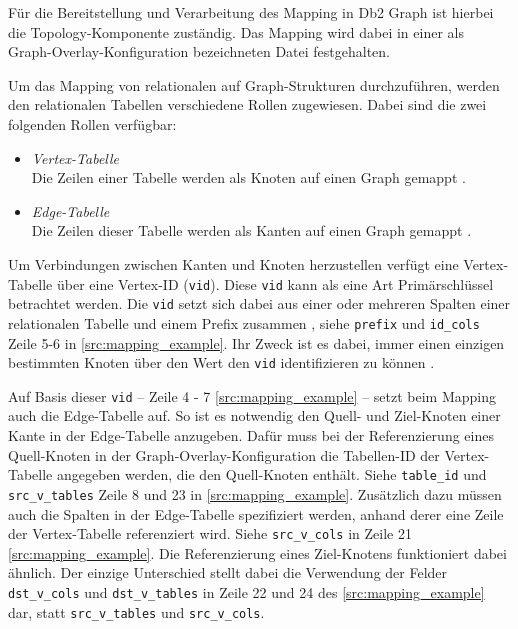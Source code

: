 Für die Bereitstellung und Verarbeitung des Mapping in Db2 Graph ist hierbei die Topology-Komponente zuständig. Das Mapping wird dabei in einer als Graph-Overlay-Konfiguration bezeichneten Datei festgehalten.  

Um das Mapping von relationalen auf Graph-Strukturen durchzuführen, werden den relationalen Tabellen verschiedene Rollen zugewiesen. Dabei sind die zwei folgenden Rollen verfügbar:
\begin{itemize}
    \item \textit{Vertex-Tabelle}\\Die Zeilen einer Tabelle werden als Knoten auf einen Graph gemappt \cite{sigmod_tian, yt_tian}.
    \item \textit{Edge-Tabelle}\\Die Zeilen dieser Tabelle werden als Kanten auf einen Graph gemappt \cite{sigmod_tian, yt_tian}.
\end{itemize}


Um Verbindungen zwischen Kanten und Knoten herzustellen verfügt eine Vertex-Tabelle über eine Vertex-ID (\texttt{vid}). Diese \texttt{vid} kann als eine Art Primärschlüssel betrachtet werden. Die \texttt{vid} setzt sich dabei aus einer oder mehreren Spalten einer relationalen Tabelle und einem Prefix zusammen \cite{sigmod_tian, yt_tian}, siehe \texttt{prefix} und \texttt{id\_cols} Zeile 5-6 in \autoref{src:mapping_example}. Ihr Zweck ist es dabei, immer einen einzigen bestimmten Knoten über den Wert den \texttt{vid} identifizieren zu können \cite{sigmod_tian, yt_tian}. 

Auf Basis dieser \texttt{vid} -- Zeile 4 - 7 \autoref{src:mapping_example} -- setzt beim Mapping auch die Edge-Tabelle auf. So ist es notwendig den Quell- und Ziel-Knoten einer Kante in der Edge-Tabelle anzugeben. Dafür muss bei der Referenzierung eines Quell-Knoten in der Graph-Overlay-Konfiguration die Tabellen-ID der Vertex-Tabelle angegeben werden, die den Quell-Knoten enthält. Siehe \texttt{table\_id} und \texttt{src\_v\_tables} Zeile 8 und 23 in \autoref{src:mapping_example}. Zusätzlich dazu müssen auch die Spalten in der Edge-Tabelle spezifiziert werden, anhand derer eine Zeile der Vertex-Tabelle referenziert wird. Siehe \texttt{src\_v\_cols} in Zeile 21 \autoref{src:mapping_example}. Die Referenzierung eines Ziel-Knotens funktioniert dabei ähnlich. Der einzige Unterschied stellt dabei die Verwendung der Felder \texttt{dst\_v\_cols} und \texttt{dst\_v\_tables} in Zeile 22 und 24 des \autoref{src:mapping_example} dar, statt \texttt{src\_v\_tables} und \texttt{src\_v\_cols}.

